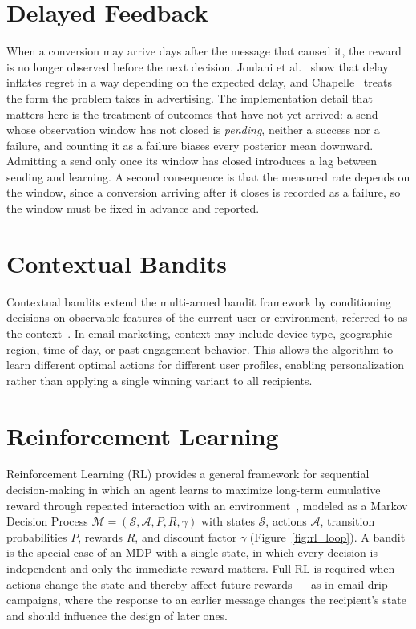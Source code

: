 \section{Delayed Feedback}
\label{sec:bg_delay}

When a conversion may arrive days after the message that caused it, the reward is no longer observed before the next decision. Joulani et al.~\cite{joulani2013online} show that delay inflates regret in a way depending on the expected delay, and Chapelle~\cite{chapelle2014modeling} treats the form the problem takes in advertising. The implementation detail that matters here is the treatment of outcomes that have not yet arrived: a send whose observation window has not closed is \emph{pending}, neither a success nor a failure, and counting it as a failure biases every posterior mean downward. Admitting a send only once its window has closed introduces a lag between sending and learning. A second consequence is that the measured rate depends on the window, since a conversion arriving after it closes is recorded as a failure, so the window must be fixed in advance and reported.

\section{Contextual Bandits}

Contextual bandits extend the multi-armed bandit framework by conditioning decisions on observable features of the current user or environment, referred to as the context~\cite{li2010contextual}. In email marketing, context may include device type, geographic region, time of day, or past engagement behavior. This allows the algorithm to learn different optimal actions for different user profiles, enabling personalization rather than applying a single winning variant to all recipients.

\section{Reinforcement Learning}
\label{sec:bg_rl}

Reinforcement Learning (RL) provides a general framework for sequential decision-making in which an agent learns to maximize long-term cumulative reward through repeated interaction with an environment~\cite{sutton2018reinforcement}, modeled as a Markov Decision Process $\mathcal{M} = (\mathcal{S}, \mathcal{A}, P, R, \gamma)$ with states $\mathcal{S}$, actions $\mathcal{A}$, transition probabilities $P$, rewards $R$, and discount factor $\gamma$ (Figure~\ref{fig:rl_loop}). A bandit is the special case of an MDP with a single state, in which every decision is independent and only the immediate reward matters. Full RL is required when actions change the state and thereby affect future rewards --- as in email drip campaigns, where the response to an earlier message changes the recipient's state and should influence the design of later ones.

